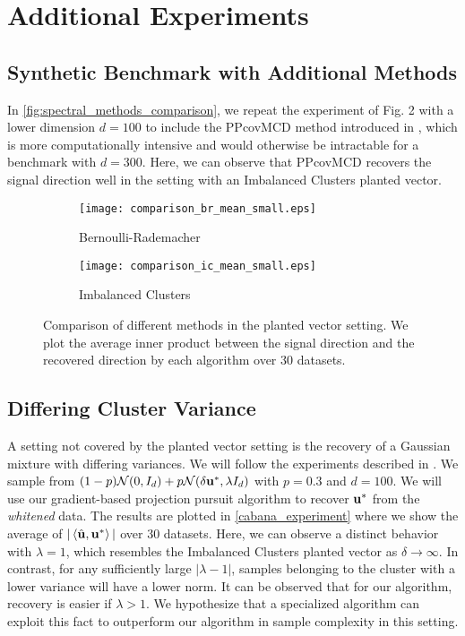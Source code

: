 \section{Additional Experiments}
\label{supplement}
\subsection{Synthetic Benchmark with Additional Methods}
In \autoref{fig:spectral_methods_comparison}, we repeat the experiment of Fig. 2 with a lower dimension $d = 100$ to include the PPcovMCD method introduced in \citet{POKOJOVY2022107475}, which is more computationally intensive and would otherwise be intractable for a benchmark with $d = 300$.
Here, we can observe that PPcovMCD recovers the signal direction well in the setting with an Imbalanced Clusters planted vector.

\begin{figure}[H]
    \centering
    \begin{subfigure}[b]{0.49\textwidth}
        \texttt{[image: comparison\_br\_mean\_small.eps]}   
        \caption{Bernoulli-Rademacher}
        \label{br_comp}
    \end{subfigure}
    \hfill
    \begin{subfigure}[b]{0.49\textwidth}
        \texttt{[image: comparison\_ic\_mean\_small.eps]}
        \caption{Imbalanced Clusters}
        \label{ic_comp}
    \end{subfigure}
    \caption{
        Comparison of different methods in the planted vector setting.
        We plot the average inner product between the signal direction and the recovered direction by each algorithm over 30 datasets.
    }
    \label{fig:spectral_methods_comparison}
\end{figure}

\subsection{Differing Cluster Variance}
A setting not covered by the planted vector setting is the recovery of a Gaussian mixture with differing variances.
We will follow the experiments described in \citet{Cabana2021}.
We sample from $(1-p) \mathcal{N}(0, I_d) + p \mathcal{N}(\delta \mathbf{u}^*, \lambda I_d)$ with $p = 0.3$ and $d = 100$.
We will use our gradient-based projection pursuit algorithm to recover $\mathbf{u}^*$ from the \emph{whitened} data.
The results are plotted in \autoref{cabana_experiment} where we show the average of $|\left\langle \hat{\mathbf{u}}, \mathbf{u}^* \right\rangle|$ over 30 datasets.
Here, we can observe a distinct behavior with $\lambda = 1$, which resembles the Imbalanced Clusters planted vector as $\delta \to \infty$.
In contrast, for any sufficiently large $|\lambda - 1|$, samples belonging to the cluster with a lower variance will have a lower norm.
It can be observed that for our algorithm, recovery is easier if $\lambda > 1$.
We hypothesize that a specialized algorithm can exploit this fact to outperform our algorithm in sample complexity in this setting.

